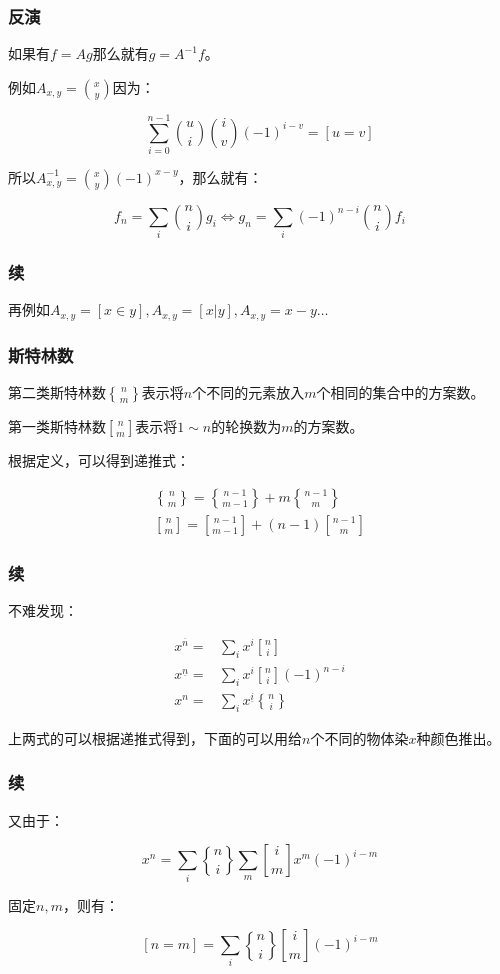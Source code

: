 \documentclass[10pt]{beamer}
\begin{document}
	\begin{frame}
		\frametitle{反演}
	
		如果有$f=Ag$那么就有$g=A^{-1}f$。

		例如$A_{x,y}={x\choose y}$因为：

		$$
		\sum_{i=0}^{n-1} {u\choose i}{i\choose v}(-1)^{i-v}=[u=v]
		$$

		所以$A^{-1}_{x,y}={x\choose y}(-1)^{x-y}$，那么就有：

		$$
		f_n=\sum_i {n\choose i} g_i\Leftrightarrow g_n=\sum_i (-1)^{n-i}{n\choose i}f_i
		$$
	
	\end{frame}
	\begin{frame}
		\frametitle{续}
	
		再例如$A_{x,y}=[x\in y],A_{x,y}=[x|y],A_{x,y}=x-y\dots$
	
	\end{frame}
	\begin{frame}
		\frametitle{斯特林数}
	
		第二类斯特林数${n\brace m}$表示将$n$个不同的元素放入$m$个相同的集合中的方案数。

		第一类斯特林数${n\brack m}$表示将$1\sim n$的轮换数为$m$的方案数。

		根据定义，可以得到递推式：

		$$
		\begin{aligned}
			{n\brace m}={n-1\brace m-1}+m{n-1\brace m}\\
			{n\brack m}={n-1\brack m-1}+(n-1){n-1\brack m}
		\end{aligned}
		$$
		
	\end{frame}
	\begin{frame}
		\frametitle{续}
	
		不难发现：

		$$
		\begin{aligned}
			x^{\overline n}=&\sum_i x^i{n\brack i}\\
			x^{\underline n}=&\sum_i x^i{n\brack i}(-1)^{n-i}\\
			x^n=&\sum_i x^{\underline i}{n\brace i}
		\end{aligned}
		$$

		上两式的可以根据递推式得到，下面的可以用给$n$个不同的物体染$x$种颜色推出。
	
	\end{frame}
	\begin{frame}
		\frametitle{续}
	
		又由于：

		$$
		x^n=\sum_i {n\brace i} \sum_{m} {i\brack m} x^m (-1)^{i-m}
		$$

		固定$n,m$，则有：

		$$
		[n=m]=\sum_i{n\brace i}{i\brack m}(-1)^{i-m}
		$$
	
	\end{frame}
\end{document}
